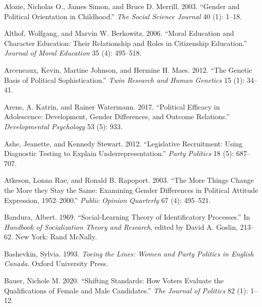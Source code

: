 \documentclass[
  letterpaper,
  DIV=11,
  numbers=noendperiod]{scrreprt}
\newlength{\cslhangindent}
\newlength{\cslentryspacingunit} %
\newenvironment{CSLReferences}[2] %
 {%
  \setlength{\parindent}{0pt}
  \ifodd #1
  \let\oldpar\par
  \def\par{\hangindent=\cslhangindent\oldpar}
  \fi
  \setlength{\parskip}{#2\cslentryspacingunit}
 }%
 {}
\begin{document}
\hypertarget{refs}{}
\begin{CSLReferences}{1}{0}
\leavevmode{}%
Alozie, Nicholas O., James Simon, and Bruce D. Merrill. 2003. {``{Gender
and Political Orientation in Childhood}.''} \emph{The Social Science
Journal} 40 (1): 1--18.

\leavevmode{}%
Althof, Wolfgang, and Marvin W. Berkowitz. 2006. {``{Moral Education and
Character Education: Their Relationship and Roles in Citizenship
Education}.''} \emph{Journal of Moral Education} 35 (4): 495--518.

\leavevmode{}%
Arceneaux, Kevin, Martine Johnson, and Hermine H. Maes. 2012. {``{The
Genetic Basis of Political Sophistication}.''} \emph{Twin Research and
Human Genetics} 15 (1): 34--41.

\leavevmode{}%
Arens, A. Katrin, and Rainer Watermann. 2017. {``{Political Efficacy in
Adolescence: Development, Gender Differences, and Outcome Relations}.''}
\emph{Developmental Psychology} 53 (5): 933.

\leavevmode{}%
Ashe, Jeanette, and Kennedy Stewart. 2012. {``{Legislative Recruitment:
Using Diagnostic Testing to Explain Underrepresentation}.''} \emph{Party
Politics} 18 (5): 687--707.

\leavevmode{}%
Atkeson, Lonna Rae, and Ronald B. Rapoport. 2003. {``{The More Things
Change the More they Stay the Same: Examining Gender Differences in
Political Attitude Expression, 1952--2000}.''} \emph{Public Opinion
Quarterly} 67 (4): 495--521.

\leavevmode{}%
Bandura, Albert. 1969. {``{Social-Learning Theory of Identificatory
Processes}.''} In \emph{{Handbook of Socialization Theory and
Research}}, edited by David A. Goslin, 213--62. New York: Rand McNally.

\leavevmode{}%
Bashevkin, Sylvia. 1993. \emph{{Toeing the Lines: Women and Party
Politics in English Canada}}. Oxford University Press.

\leavevmode{}%
Bauer, Nichole M. 2020. {``{Shifting Standards: How Voters Evaluate the
Qualifications of Female and Male Candidates}.''} \emph{The Journal of
Politics} 82 (1): 1--12.


\end{CSLReferences}
\end{document}
